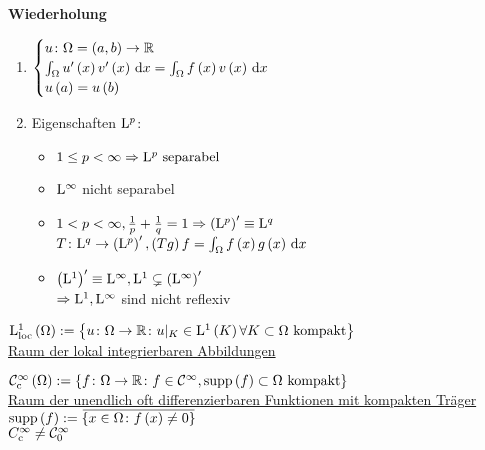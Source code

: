 \textbf{Wiederholung}\\
\begin{enumerate}
\item	
	$\begin{cases}
			u\colon\Omega=\left(a,b\right)\to\mathbb{R}\\
			\int_{\Omega}u^{\prime}\left(x\right)v^{\prime}\left(x\right)\,\mathrm{d}x = \int_{\Omega}f\left(x\right)v\left(x\right)\,\mathrm{d}x\\
			u\left(a\right)=u\left(b\right)
		\end{cases}$
\item{}
	Eigenschaften $\mathrm{L}^{p}$:\\
	\begin{itemize}
		\item $1\leq p <\infty \Rightarrow \mathrm{L}^{p}\text{ separabel}$
		\item $\mathrm{L}^{\infty}$ nicht separabel
		\item $1 < p <\infty, \frac{1}{p}+\frac{1}{q}=1 \Rightarrow \left(\mathrm{L}^{p}\right)^{\prime} \equiv \mathrm{L}^{q}$\\
			  $T\colon \mathrm{L}^{q}\to\left(\mathrm{L}^{p}\right)^{\prime}, \left(Tg\right)f = \int_{\Omega}f\left(x\right)g\left(x\right)\,\mathrm{d}x$
		\item $\left(\mathrm{L}^{1}\right)^{\prime}\equiv\mathrm{L}^{\infty}, \mathrm{L}^{1}\subsetneq\left(\mathrm{L}^{\infty}\right)^{\prime}$\\
				$\Rightarrow \mathrm{L}^{1}, \mathrm{L}^{\infty}$ sind nicht reflexiv
	\end{itemize}
\end{enumerate}

\begin{definition}
	$\mathrm{L}^{1}_{\text{loc}}\left(\Omega\right) := \left\{u\colon\Omega\to\mathbb{R}\colon u|_{K}\in\mathrm{L}^{1}\left(K\right)\forall K\subset\Omega \text{ kompakt}\right\}$\\
	\underline{Raum der lokal integrierbaren Abbildungen}
\end{definition}

\begin{definition}
	$\mathcal{C}^{\infty}_{\text{c}}\left(\Omega\right) := \left\{f\colon\Omega\to\mathbb{R}\colon f\in\mathcal{C}^{\infty},\operatorname{supp}\left(f\right)\subset\Omega\text{ kompakt}\right\}$\\
	\underline{Raum der unendlich oft differenzierbaren Funktionen mit kompakten Träger}\\
	$\operatorname{supp}\left(f\right):=\overbar{\left\{x\in\W\colon f\left(x\right)\neq 0\right\}}$\\
	\boldmath$C^{\infty}_{\text{c}}\neq \mathcal{C}^{\infty}_{0}$
\end{definition}

